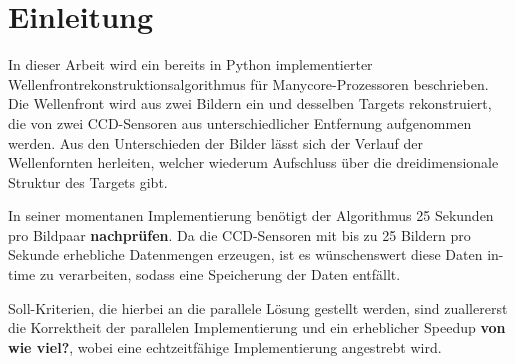 \chapter{Einleitung}

\begin{correctmore}
	In dieser Arbeit wird ein bereits in Python implementierter Wellenfrontrekonstruktionsalgorithmus für Manycore-Prozessoren beschrieben.
	Die Wellenfront wird aus zwei Bildern ein und desselben Targets rekonstruiert, die von zwei CCD-Sensoren aus unterschiedlicher Entfernung aufgenommen werden. Aus den Unterschieden der Bilder lässt sich der Verlauf der Wellenfornten herleiten, welcher wiederum Aufschluss über die dreidimensionale Struktur des Targets gibt. 
	
	In seiner momentanen Implementierung benötigt der Algorithmus 25 Sekunden pro Bildpaar \textbf{nachprüfen}. Da die CCD-Sensoren mit bis zu 25 Bildern pro Sekunde erhebliche Datenmengen erzeugen, ist es wünschenswert diese Daten in-time zu verarbeiten, sodass eine Speicherung der Daten entfällt. 
	
	Soll-Kriterien, die hierbei an die parallele Lösung gestellt werden, sind zuallererst die Korrektheit der parallelen Implementierung und ein erheblicher Speedup \textbf{von wie viel?}, wobei eine echtzeitfähige Implementierung angestrebt wird.
\end{correctmore}	

\iffalse
- Anwendungsbeschriebung:
-> Wellenfrontrekonstruktionsalgorithmus liegt in Python implementiert vor
-> Rekonstruktion der Wellenfront aus Bildern 2er CCD Kameras in verschiedenem Abstand
- Motivation
-> momentaner Wellenfrontrekonstruktionsalgorithmus benötigt 25s/Frame
-> Kamera liefert 10 Frames/s
-> Daten müssen zwischengespeichert werden
- Einführen der Soll-Kriterien:
-> korrekte Rekonstruktion der Wellenfronten
-> deutliche Beschnleunigung der momentanen Implementierung (5x+)
\fi